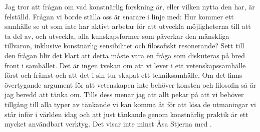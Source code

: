 \documentclass[11pt]{article}
\begin{document}
Jag tror att frågan om vad konstnärlig forskning är, eller vilken
nytta den har, är felställd. Frågan vi borde ställa oss är snarare i
linje med: Hur kommer ett samhälle se ut som inte har aktivt arbetar
för att utveckla möjligheterna till att ta del av, och utveckla, alla
kunskapsformer som påverkar den mänskliga tillvaron, inklusive
konstnärlig sensibilitet och filosofiskt resonerande?  Sett till den
frågan blir det klart att detta måste vara en fråga som diskuteras på
bred front i samhället. Det är ingen tvekan om att vi lever i ett
vetenskapssamhälle först och främst och att det i sin tur skapat ett
tekniksamhälle. Om det finns övertygande argument för att vetenskapen
inte behöver konsten och filosofin så är jag beredd att tänka
om. Tills dess menar jag att allt pekar på att vi behöver tillgång
till alla typer av tänkande vi kan komma åt för att lösa de utmaningar
vi står inför i världen idag och att just tänkande genom konstnärlig
praktik är ett mycket användbart verktyg. Det visar inte minst Åsa
Stjerna med .

\printendnotes
\printbibliography
\end{document}

